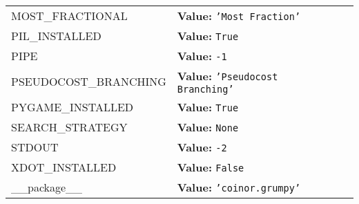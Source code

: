 \begin{longtable}{|p{\varnamewidth}|p{\vardescrwidth}|l}
\cline{1-2}
\raggedright M\-O\-S\-T\-\_\-F\-R\-A\-C\-T\-I\-O\-N\-A\-L\- & \raggedright \textbf{Value:} 
{\tt \texttt{'}\texttt{Most Fraction}\texttt{'}}&\\
\cline{1-2}
\raggedright P\-I\-L\-\_\-I\-N\-S\-T\-A\-L\-L\-E\-D\- & \raggedright \textbf{Value:} 
{\tt True}&\\
\cline{1-2}
\raggedright P\-I\-P\-E\- & \raggedright \textbf{Value:} 
{\tt -1}&\\
\cline{1-2}
\raggedright P\-S\-E\-U\-D\-O\-C\-O\-S\-T\-\_\-B\-R\-A\-N\-C\-H\-I\-N\-G\- & \raggedright \textbf{Value:} 
{\tt \texttt{'}\texttt{Pseudocost Branching}\texttt{'}}&\\
\cline{1-2}
\raggedright P\-Y\-G\-A\-M\-E\-\_\-I\-N\-S\-T\-A\-L\-L\-E\-D\- & \raggedright \textbf{Value:} 
{\tt True}&\\
\cline{1-2}
\raggedright S\-E\-A\-R\-C\-H\-\_\-S\-T\-R\-A\-T\-E\-G\-Y\- & \raggedright \textbf{Value:} 
{\tt None}&\\
\cline{1-2}
\raggedright S\-T\-D\-O\-U\-T\- & \raggedright \textbf{Value:} 
{\tt -2}&\\
\cline{1-2}
\raggedright X\-D\-O\-T\-\_\-I\-N\-S\-T\-A\-L\-L\-E\-D\- & \raggedright \textbf{Value:} 
{\tt False}&\\
\cline{1-2}
\raggedright \_\-\_\-p\-a\-c\-k\-a\-g\-e\-\_\-\_\- & \raggedright \textbf{Value:} 
{\tt \texttt{'}\texttt{coinor.grumpy}\texttt{'}}&\\
\cline{1-2}
\end{longtable}

